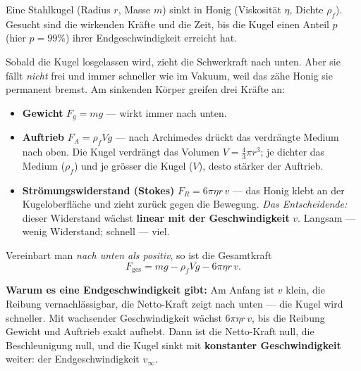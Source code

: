 

Eine Stahlkugel (Radius $r$, Masse $m$) sinkt in Honig (Viskosität $\eta$,
Dichte $\rho_f$). Gesucht sind die wirkenden Kräfte und die Zeit, bis die
Kugel einen Anteil $p$ (hier $p=99\%$) ihrer Endgeschwindigkeit erreicht hat.

\begin{werkzeugkasten}
Sobald die Kugel losgelassen wird, zieht die Schwerkraft nach unten. Aber sie
fällt \emph{nicht} frei und immer schneller wie im Vakuum, weil das zähe Honig
sie permanent bremst. Am sinkenden Körper greifen drei Kräfte an:

\begin{itemize}
  \item \textbf{Gewicht} $F_g = m g$ --- wirkt immer nach unten.
  \item \textbf{Auftrieb} $F_A=\rho_f V g$ --- nach Archimedes drückt das
        verdrängte Medium nach oben. Die Kugel verdrängt das Volumen
        $V=\frac43\pi r^3$; je dichter das Medium ($\rho_f$) und je grösser die
        Kugel ($V$), desto stärker der Auftrieb.
  \item \textbf{Strömungswiderstand (Stokes)} $F_R=6\pi\eta r\, v$ --- das Honig
        klebt an der Kugeloberfläche und zieht zurück gegen die Bewegung.
        \emph{Das Entscheidende:} dieser Widerstand wächst \textbf{linear mit
        der Geschwindigkeit} $v$. Langsam --- wenig Widerstand; schnell --- viel.
\end{itemize}
Vereinbart man \emph{nach unten als positiv}, so ist die Gesamtkraft
\[
  F_{\text{ges}} = m g - \rho_f V g - 6\pi\eta r\, v .
\]

\textbf{Warum es eine Endgeschwindigkeit gibt:} Am Anfang ist $v$ klein, die
Reibung vernachlässigbar, die Netto-Kraft zeigt nach unten --- die Kugel wird
schneller. Mit wachsender Geschwindigkeit wächst $6\pi\eta r\,v$, bis die
Reibung Gewicht und Auftrieb exakt aufhebt. Dann ist die Netto-Kraft null,
die Beschleunigung null, und die Kugel sinkt mit \textbf{konstanter
Geschwindigkeit} weiter: der Endgeschwindigkeit $v_\infty$.
\end{werkzeugkasten}

